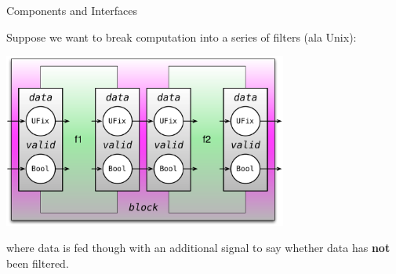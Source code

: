 \documentclass[xcolor=pdflatex,dvipsnames,table]{beamer}
\begin{document}
\begin{frame}[fragile]{Components and Interfaces}

Suppose we want to break computation into a series of filters (ala Unix):

\begin{center}
\includegraphics[width=0.7\textwidth]{figs/filtering.pdf} 
\end{center}

\noindent 
where data is fed though with an additional  signal to say whether data has \textbf{not} been filtered.

\end{frame}
\end{document}
